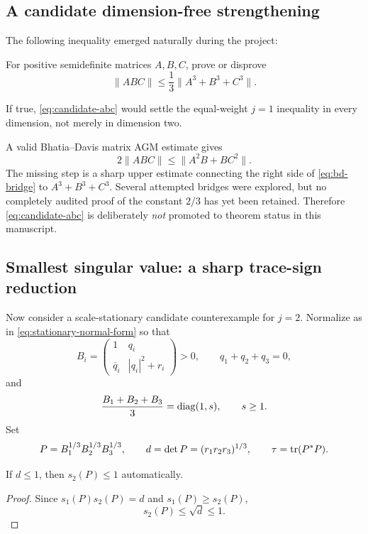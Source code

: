 \subsection{A candidate dimension-free strengthening}
The following inequality emerged naturally during the project:
\begin{problem}
For positive semidefinite matrices $A,B,C$, prove or disprove
\begin{equation}
\boxed{
\|ABC\|\le \frac13\|A^3+B^3+C^3\|.
}
\label{eq:candidate-abc}
\end{equation}
\end{problem}
If true, \eqref{eq:candidate-abc} would settle the equal-weight $j=1$ inequality in every dimension, not merely in dimension two.

A valid Bhatia--Davis matrix AGM estimate gives
\begin{equation}
2\|ABC\|\le \|A^2B+BC^2\|.
\label{eq:bd-bridge}
\end{equation}
The missing step is a sharp upper estimate connecting the right side of \eqref{eq:bd-bridge} to $A^3+B^3+C^3$.  Several attempted bridges were explored, but no completely audited proof of the constant $2/3$ has yet been retained.  Therefore \eqref{eq:candidate-abc} is deliberately \emph{not} promoted to theorem status in this manuscript.

\subsection{Smallest singular value: a sharp trace-sign reduction}
Now consider a scale-stationary candidate counterexample for $j=2$.  Normalize as in \eqref{eq:stationary-normal-form} so that
\begin{equation}
B_i=\begin{pmatrix}1&q_i\\ \overline q_i&|q_i|^2+r_i\end{pmatrix}>0,
\qquad q_1+q_2+q_3=0,
\label{eq:j2-normal}
\end{equation}
and
\[
\frac{B_1+B_2+B_3}{3}=\operatorname{diag}(1,s),\qquad s\ge1.
\]
Set
\[
P=B_1^{1/3}B_2^{1/3}B_3^{1/3},
\qquad
d=\det P=(r_1r_2r_3)^{1/3},
\qquad
\tau=\operatorname{tr}(P^*P).
\]

\begin{proposition}
If $d\le1$, then $s_2(P)\le1$ automatically.
\end{proposition}
\begin{proof}
Since $s_1(P)s_2(P)=d$ and $s_1(P)\ge s_2(P)$,
\[
s_2(P)\le \sqrt d\le1.
\]
\end{proof}

